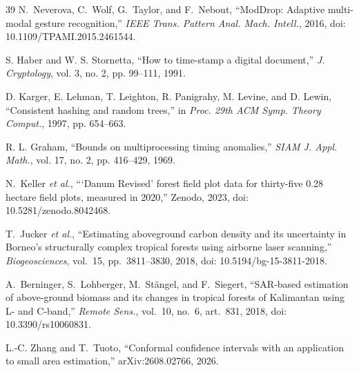 \documentclass[conference,a4paper]{IEEEtran}
\begin{document}
\begin{thebibliography}{39}
N.~Neverova, C.~Wolf, G.~Taylor, and F.~Nebout, ``ModDrop: Adaptive multi-modal gesture recognition,'' \textit{IEEE Trans. Pattern Anal. Mach. Intell.}, 2016, doi: 10.1109/TPAMI.2015.2461544.

S. Haber and W. S. Stornetta, ``How to time-stamp a digital document,'' \textit{J. Cryptology}, vol. 3, no. 2, pp. 99--111, 1991.

D. Karger, E. Lehman, T. Leighton, R. Panigrahy, M. Levine, and D. Lewin, ``Consistent hashing and random trees,'' in \textit{Proc. 29th ACM Symp. Theory Comput.}, 1997, pp. 654--663.

R. L. Graham, ``Bounds on multiprocessing timing anomalies,'' \textit{SIAM J. Appl. Math.}, vol. 17, no. 2, pp. 416--429, 1969.

N.~Keller \textit{et al.}, ```Danum Revised' forest field plot data for thirty-five 0.28 hectare field plots, measured in 2020,'' Zenodo, 2023, doi: 10.5281/zenodo.8042468.

T.~Jucker \textit{et al.}, ``Estimating aboveground carbon density and its uncertainty in Borneo's structurally complex tropical forests using airborne laser scanning,'' \textit{Biogeosciences}, vol.~15, pp.~3811--3830, 2018, doi: 10.5194/bg-15-3811-2018.

A.~Berninger, S.~Lohberger, M.~St\"angel, and F.~Siegert, ``SAR-based estimation of above-ground biomass and its changes in tropical forests of Kalimantan using L- and C-band,'' \textit{Remote Sens.}, vol.~10, no.~6, art.~831, 2018, doi: 10.3390/rs10060831.

L.-C. Zhang and T.~Tuoto, ``Conformal confidence intervals with an application to small area estimation,'' arXiv:2608.02766, 2026.

\end{thebibliography}
\end{document}
